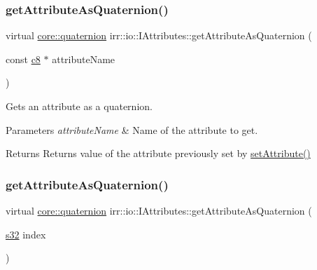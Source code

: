\subsubsection{\texorpdfstring{get\+Attribute\+As\+Quaternion()}{getAttributeAsQuaternion()}\hspace{0.1cm}{\footnotesize\ttfamily [2/4]}}
{\footnotesize\ttfamily virtual \hyperlink{classirr_1_1core_1_1quaternion}{core\+::quaternion} irr\+::io\+::\+I\+Attributes\+::get\+Attribute\+As\+Quaternion (\begin{DoxyParamCaption}\item[{const \hyperlink{namespaceirr_a9395eaea339bcb546b319e9c96bf7410}{c8} $\ast$}]{attribute\+Name }\end{DoxyParamCaption})\hspace{0.3cm}{\ttfamily [pure virtual]}}



Gets an attribute as a quaternion. 


\begin{DoxyParams}{Parameters}
{\em attribute\+Name} & Name of the attribute to get. \\
\hline
\end{DoxyParams}
\begin{DoxyReturn}{Returns}
Returns value of the attribute previously set by \hyperlink{classirr_1_1io_1_1IAttributes_a03fa31acb481ae23678676cc183f09a6}{set\+Attribute()} 
\end{DoxyReturn}
\mbox{\label{classirr_1_1io_1_1IAttributes_aee7cc16cae259af9cbdd37bfc9956a5f}} 
\subsubsection{\texorpdfstring{get\+Attribute\+As\+Quaternion()}{getAttributeAsQuaternion()}\hspace{0.1cm}{\footnotesize\ttfamily [3/4]}}
{\footnotesize\ttfamily virtual \hyperlink{classirr_1_1core_1_1quaternion}{core\+::quaternion} irr\+::io\+::\+I\+Attributes\+::get\+Attribute\+As\+Quaternion (\begin{DoxyParamCaption}\item[{\hyperlink{namespaceirr_ac66849b7a6ed16e30ebede579f9b47c6}{s32}}]{index }\end{DoxyParamCaption})\hspace{0.3cm}{\ttfamily [pure virtual]}}



